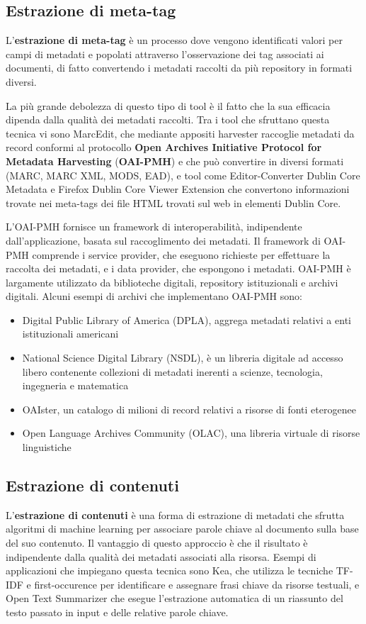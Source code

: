 \subsection{Estrazione di meta-tag}
L'\textbf{estrazione di meta-tag} è un processo dove vengono identificati valori per campi di metadati e popolati attraverso l'osservazione dei tag associati ai documenti, di fatto convertendo i metadati raccolti da più repository in formati diversi.

La più grande debolezza di questo tipo di tool è il fatto che la sua efficacia dipenda dalla qualità dei metadati raccolti.
Tra i tool che sfruttano questa tecnica vi sono MarcEdit, che mediante appositi harvester raccoglie metadati da record conformi al protocollo \textbf{Open Archives Initiative Protocol for Metadata Harvesting} (\textbf{OAI-PMH}) e che può convertire in diversi formati (MARC, MARC XML, MODS, EAD), e tool come Editor-Converter Dublin Core Metadata e Firefox Dublin Core Viewer Extension che convertono informazioni trovate nei meta-tags dei file HTML trovati sul web in elementi Dublin Core.

L'OAI-PMH fornisce un framework di interoperabilità, indipendente dall'applicazione, basata sul raccoglimento dei metadati. Il framework di OAI-PMH comprende i service provider, che eseguono richieste per effettuare la raccolta dei metadati, e i data provider, che espongono i metadati. OAI-PMH è largamente utilizzato da biblioteche digitali, repository istituzionali e archivi digitali\cite{harvesting}. Alcuni esempi di archivi che implementano OAI-PMH sono:

\begin{itemize}
\item Digital Public Library of America (DPLA), aggrega metadati relativi a enti istituzionali americani
\item National Science Digital Library (NSDL), è un libreria digitale ad accesso libero contenente collezioni di metadati inerenti a scienze, tecnologia, ingegneria e matematica
\item OAIster, un catalogo di milioni di record relativi a risorse di fonti eterogenee
\item Open Language Archives Community (OLAC), una libreria virtuale di risorse linguistiche
\end{itemize}

\subsection{Estrazione di contenuti}
L'\textbf{estrazione di contenuti} è una forma di estrazione di metadati che sfrutta algoritmi di machine learning per associare parole chiave al documento sulla base del suo contenuto. Il vantaggio di questo approccio è che il risultato è indipendente dalla qualità dei metadati associati alla risorsa. Esempi di applicazioni che impiegano questa tecnica sono Kea, che utilizza le tecniche TF-IDF e first-occurence per identificare e assegnare frasi chiave da risorse testuali, e Open Text Summarizer che esegue l'estrazione automatica di un riassunto del testo passato in input e delle relative parole chiave. 

